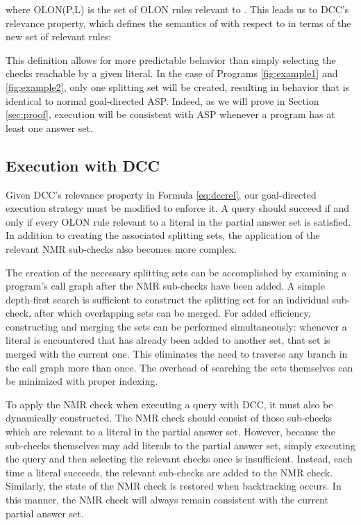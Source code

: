 \documentclass{new_tlp}
\begin{document}
\noindent where OLON(P,L) is the set of OLON rules relevant to . This leads
us to DCC's relevance property, which defines the semantics of  with respect
to  in terms of the new set of relevant rules:


This definition allows for more predictable behavior than simply selecting the 
checks reachable by a given literal. In the case of Programs \ref{fig:example1} 
and \ref{fig:example2}, only one splitting set will be created, resulting in 
behavior that is identical to normal goal-directed ASP. Indeed, as we will 
prove in Section \ref{sec:proof}, execution will be consistent with ASP 
whenever a program has at least one answer set.


\subsection{Execution with DCC}

Given DCC's relevance property in Formula \ref{eq:dccrel}, our goal-directed 
execution strategy must be modified to enforce it. A query should succeed if and
only if every OLON rule relevant to a literal in the partial answer set is
satisfied. In addition to creating the associated splitting sets, the
application of the relevant NMR sub-checks also becomes more complex.

The creation of the necessary splitting sets can be accomplished by examining a 
program's call graph after the NMR sub-checks have been added. A simple 
depth-first search is sufficient to construct the splitting set for an
individual sub-check, after which overlapping sets can be merged. For added
efficiency, constructing and merging the sets can be performed simultaneously:
whenever a literal is encountered that has already been added to another set,
that set is merged with the current one. This eliminates the need to traverse
any branch in the call graph more than once. The overhead of searching the sets
themselves can be minimized with proper indexing.

To apply the NMR check when executing a query with DCC, it must also be 
dynamically constructed. The NMR check should consist of those sub-checks which 
are relevant to a literal in the partial answer set. However, because the 
sub-checks themselves may add literals to the partial answer set, simply 
executing the query and then selecting the relevant checks once is 
insufficient. Instead, each time a literal succeeds, the relevant sub-checks 
are added to the NMR check. Similarly, the state of the NMR check is restored 
when backtracking occurs. In this manner, the NMR check will always remain 
consistent with the current partial answer set.
\end{document}
